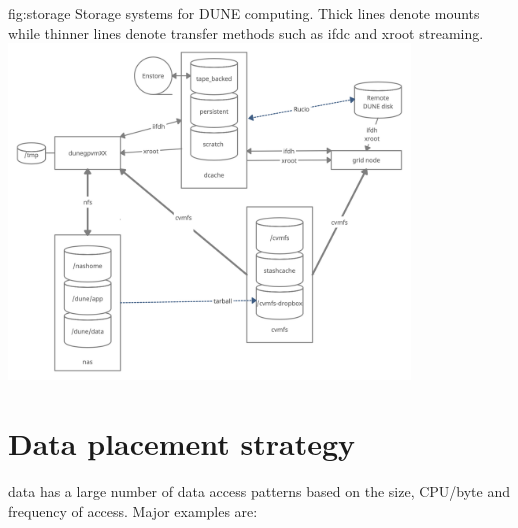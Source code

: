 \documentclass[../main-v1.tex]{subfiles}
\begin{document}
\begin{dunefigure}
{fig:storage}
{Storage systems for DUNE computing.  Thick lines denote mounts while thinner lines denote transfer methods such as ifdc and xroot streaming.}
\includegraphics[width=0.8\textwidth]{graphics/DataManagement/StorageMap2.png}
\end{dunefigure}

\section{Data placement strategy}

 data has a large number of data access patterns based on the size, CPU/byte and frequency of access.   Major examples are:
\end{document}
